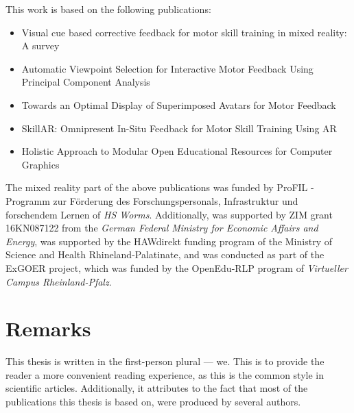 This work is based on the following publications:
\begin{itemize}
	\setlength{\itemsep}{-0.3cm}
	\item Visual cue based corrective feedback for motor skill training in mixed reality: A survey \cite{diller2022vcb}
	\item Automatic Viewpoint Selection for Interactive Motor Feedback Using Principal Component Analysis \cite{diller2024automatic}
	\item Towards an Optimal Display of Superimposed Avatars for Motor Feedback \cite{diller2025towards}
	\item SkillAR: Omnipresent In-Situ Feedback for Motor Skill Training Using AR \cite{diller2024skillar}
	\item Holistic Approach to Modular Open Educational Resources for Computer Graphics \cite{diller2024holistic}
\end{itemize}


The mixed reality part of the above publications was funded by ProFIL - Programm zur Förderung des Forschungspersonals, Infrastruktur und forschendem Lernen of \emph{HS Worms}. Additionally, \cite{diller2024automatic} was supported by ZIM grant 16KN087122 from the \emph{German Federal Ministry for Economic Affairs and Energy}, \cite{diller2024skillar} was supported by the HAWdirekt funding program of the Ministry of Science and Health Rhineland-Palatinate, and \cite{diller2024holistic} was conducted as part of the ExGOER project, which was funded by the OpenEdu-RLP program of \emph{Virtueller Campus Rheinland-Pfalz}.

\section{Remarks}

This thesis is written in the first-person plural --- we. This is to provide the reader a more convenient reading experience, as this is the common style in scientific articles. Additionally, it attributes to the fact that most of the publications this thesis is based on, were produced by several authors.